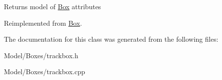 \begin{DoxyReturn}{Returns}
model of \hyperlink{class_box}{Box} attributes 
\end{DoxyReturn}


Reimplemented from \hyperlink{class_box_a5c7911f3c88eec77383c0a464979807d}{Box}.



The documentation for this class was generated from the following files\-:\begin{DoxyCompactItemize}
\item 
Model/\-Boxes/trackbox.\-h\item 
Model/\-Boxes/trackbox.\-cpp\end{DoxyCompactItemize}
